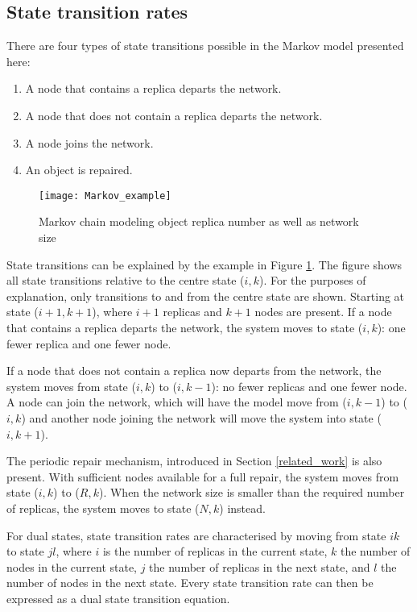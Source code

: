 \subsection{State transition rates}

There are four types of state transitions possible in the Markov model presented here:
%
\begin{enumerate}
\item A node that contains a replica departs the network.
\item A node that does not contain a replica departs the network.
\item A node joins the network.
\item An object is repaired.
\end{enumerate}


\begin{figure}[htbp]
 \centering
 \texttt{[image: Markov\_example]}
 \caption{Markov chain modeling object replica number as well as network size}
 \label{fig_markov_example}
\end{figure}

State transitions can be explained by the example in Figure \ref{fig_markov_example}. The figure shows all state transitions relative to the centre state ($i,k$). For the purposes of explanation, only transitions to and from the centre state are shown. Starting at state ($i+1,k+1$), where $i+1$ replicas and $k+1$ nodes are present. If a node that contains a replica departs the network, the system moves to state ($i,k$): one fewer replica and one fewer node.

If a node that does not contain a replica now departs from the network, the system moves from state ($i,k$) to ($i,k-1$): no fewer replicas and one fewer node. A node can join the network, which will have the model move from ($i,k-1$) to ($i,k$) and another node joining the network will move the system into state ($i,k+1$).

The periodic repair mechanism, introduced in Section \ref{related_work} is also present. With sufficient nodes available for a full repair, the system moves from state ($i,k$) to ($R,k$). When the network size is smaller than the required number of replicas, the system moves to state ($N,k$) instead.

For dual states, state transition rates are characterised by moving from state $i k$ to state $j l$, where $i$ is the number of replicas in the current state, $k$ the number of nodes in the current state, $j$ the number of replicas in the next state, and $l$ the number of nodes in the next state. Every state transition rate can then be expressed as a dual state transition equation.

